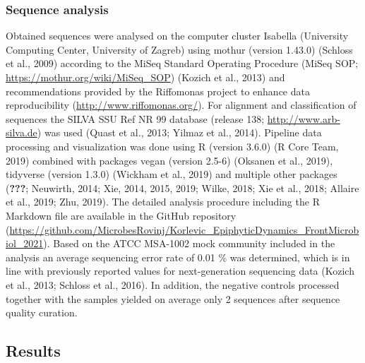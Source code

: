 \documentclass[12pt,]{article}
\begin{document}
\hypertarget{sequence-analysis}{%
\subsubsection{Sequence analysis}\label{sequence-analysis}}

Obtained sequences were analysed on the computer cluster Isabella
(University Computing Center, University of Zagreb) using mothur
(version 1.43.0) (Schloss et al., 2009) according to the MiSeq Standard
Operating Procedure (MiSeq SOP; \url{https://mothur.org/wiki/MiSeq_SOP})
(Kozich et al., 2013) and recommendations provided by the Riffomonas
project to enhance data reproducibility
(\url{http://www.riffomonas.org/}). For alignment and classification of
sequences the SILVA SSU Ref NR 99 database (release 138;
\url{http://www.arb-silva.de}) was used (Quast et al., 2013; Yilmaz et
al., 2014). Pipeline data processing and visualization was done using R
(version 3.6.0) (R Core Team, 2019) combined with packages vegan
(version 2.5-6) (Oksanen et al., 2019), tidyverse (version 1.3.0)
(Wickham et al., 2019) and multiple other packages ({\textbf{???}};
Neuwirth, 2014; Xie, 2014, 2015, 2019; Wilke, 2018; Xie et al., 2018;
Allaire et al., 2019; Zhu, 2019). The detailed analysis procedure
including the R Markdown file are available in the GitHub repository
(\url{https://github.com/MicrobesRovinj/Korlevic_EpiphyticDynamics_FrontMicrobiol_2021}).
Based on the ATCC MSA-1002 mock community included in the analysis an
average sequencing error rate of 0.01 \si{\percent} was determined,
which is in line with previously reported values for next-generation
sequencing data (Kozich et al., 2013; Schloss et al., 2016). In
addition, the negative controls processed together with the samples
yielded on average only 2 sequences after sequence quality curation.

\newpage

\hypertarget{results}{%
\subsection{Results}\label{results}}
\end{document}
